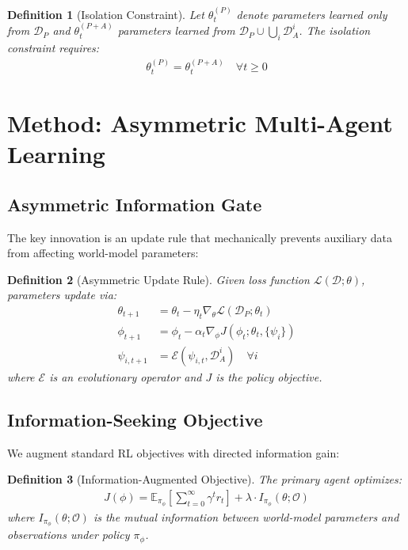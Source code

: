 \documentclass[12pt, a4paper]{article}
\newtheorem{definition}{Definition}
\begin{document}
\begin{definition}[Isolation Constraint]
Let $\theta_t^{(P)}$ denote parameters learned only from $\mathcal{D}_P$ and $\theta_t^{(P+A)}$ parameters learned from $\mathcal{D}_P \cup \bigcup_i \mathcal{D}_A^i$. The isolation constraint requires:
\begin{align}
\theta_t^{(P)} = \theta_t^{(P+A)} \quad \forall t \geq 0
\end{align}
\end{definition}

\section{Method: Asymmetric Multi-Agent Learning}

\subsection{Asymmetric Information Gate}

The key innovation is an update rule that mechanically prevents auxiliary data from affecting world-model parameters:

\begin{definition}[Asymmetric Update Rule]
Given loss function $\mathcal{L}(\mathcal{D}; \theta)$, parameters update via:
\begin{align}
\theta_{t+1} &= \theta_t - \eta_t \nabla_\theta \mathcal{L}(\mathcal{D}_P; \theta_t) \label{eq:world_update}\\
\phi_{t+1} &= \phi_t - \alpha_t \nabla_\phi J(\phi_t; \theta_t, \{\psi_i\}) \label{eq:policy_update}\\
\psi_{i,t+1} &= \mathcal{E}(\psi_{i,t}, \mathcal{D}_A^i) \quad \forall i \label{eq:aux_update}
\end{align}
where $\mathcal{E}$ is an evolutionary operator and $J$ is the policy objective.
\end{definition}

\subsection{Information-Seeking Objective}

We augment standard RL objectives with directed information gain:

\begin{definition}[Information-Augmented Objective]
The primary agent optimizes:
\begin{align}
J(\phi) = \mathbb{E}_{\pi_\phi}\left[\sum_{t=0}^{\infty} \gamma^t r_t\right] + \lambda \cdot I_{\pi_\phi}(\theta; \mathcal{O})
\end{align}
where $I_{\pi_\phi}(\theta; \mathcal{O})$ is the mutual information between world-model parameters and observations under policy $\pi_\phi$.
\end{definition}
\end{document}
